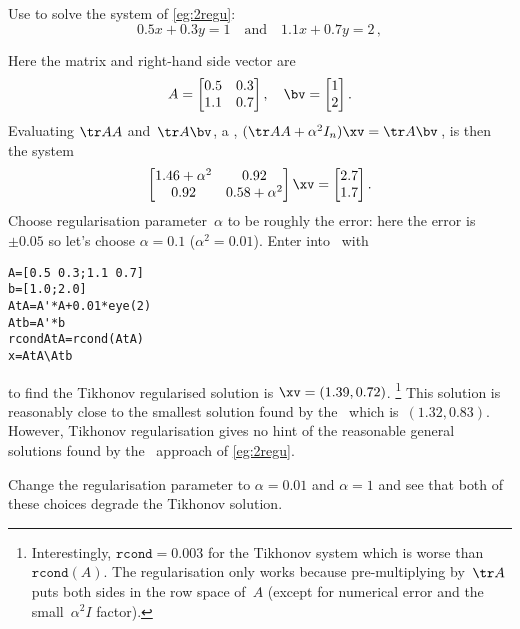 \begin{example} \label{eg:}
Use  to solve the system of \autoref{eg:2regu}:
\begin{equation*}
0.5x+0.3y=1\quad\text{and}\quad 1.1x+0.7y=2\,,
\end{equation*}
\begin{solution} 
Here the matrix and right-hand side vector are
\begin{equation*}
A=\begin{bmatrix} 0.5&0.3\\1.1&0.7 \end{bmatrix},\quad
\bv=\begin{bmatrix} 1\\2 \end{bmatrix}.
\end{equation*}
Evaluating \(\tr AA\) and~\(\tr A\bv\), a , \((\tr AA+\alpha^2I_n)\xv=\tr A\bv\)\,, is then the system
\begin{equation*}
\begin{bmatrix} 1.46+\alpha^2&0.92\\0.92&0.58+\alpha^2 \end{bmatrix}\xv=\begin{bmatrix} 2.7\\1.7 \end{bmatrix}.
\end{equation*}
Choose regularisation parameter~\(\alpha\) to be roughly the error: here the error is~\(\pm0.05\) so let's choose \(\alpha=0.1\) (\(\alpha^2=0.01\)).
Enter into \script\ with
\begin{verbatim}
A=[0.5 0.3;1.1 0.7]
b=[1.0;2.0]
AtA=A'*A+0.01*eye(2)
Atb=A'*b
rcondAtA=rcond(AtA)
x=AtA\Atb
\end{verbatim}
\setbox\ajrqrbox\hbox{}%
\marginpar{\usebox{\ajrqrbox\\[2ex]}}%
to find the Tikhonov regularised solution is \(\xv=(1.39,0.72)\).%
\footnote{Interestingly, \(\texttt{rcond}=0.003\) for the Tikhonov system which is worse than \(\texttt{rcond}(A)\).  The regularisation only works because pre-multiplying by~\(\tr A\) puts both sides in the row space of~\(A\) (except for numerical error and the small~\(\alpha^2I\) factor).}
This solution is reasonably close to the smallest solution found by the \svd\ which is~\((1.32,0.83)\).
However, Tikhonov regularisation gives no hint of the reasonable general solutions found by the \svd\ approach of \autoref{eg:2regu}.

Change the regularisation parameter to \(\alpha=0.01\) and \(\alpha=1\) and see that both of these choices degrade the Tikhonov solution.
\end{solution}
\end{example}





